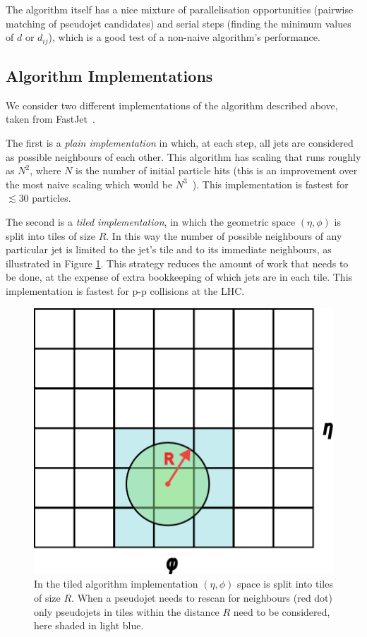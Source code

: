 \documentclass{webofc}
\begin{document}
The algorithm itself has a nice mixture of parallelisation opportunities
(pairwise matching of pseudojet candidates) and serial steps (finding the
minimum values of $d$ or $d_{ij}$), which is a good test of a non-naive
algorithm's performance.

\subsection{Algorithm Implementations}
\label{sec:algimp}

We consider two different implementations of the algorithm described above,
taken from FastJet~\cite{Cacciari:2011ma,fastjet-web}. 

The first is a \emph{plain implementation} in which, at each step, all jets are
considered as possible neighbours of each other. This algorithm has scaling that
runs roughly as $N^2$, where $N$ is the number of initial particle hits (this is
an improvement over the most naive scaling which would be
$N^3$~\cite{Cacciari:2005hq}). This implementation is fastest for $\lesssim 30$
particles.

The second is a \emph{tiled implementation}, in which the geometric space
$(\eta, \phi)$ is split into tiles of size $R$. In this way the number of
possible neighbours of any particular jet is limited to the jet's tile and to
its immediate neighbours, as illustrated in Figure \ref{fig:tiledimp}. This
strategy reduces the amount of work that needs to be done, at the expense of
extra bookkeeping of which jets are in each tile. This implementation is fastest
for p-p collisions at the LHC.

\begin{figure}[h]
  \begin{center}
    \includegraphics[width=0.4\linewidth]{tiled-algorithm.pdf}
    \caption{In the tiled algorithm implementation $(\eta,\phi)$ space is split into tiles of size $R$. When a pseudojet needs to rescan for neighbours (red dot) only pseudojets in tiles within the distance $R$ need to be considered, here shaded in light blue.}
    \label{fig:tiledimp}
  \end{center}
\end{figure}
\end{document}

